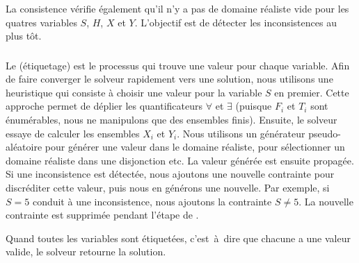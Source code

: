 La consistence vérifie également qu'il n'y a pas de domaine réaliste vide pour
les quatres variables $S$, $H$, $X$ et $Y$. L'objectif est de détecter les
inconsistences au plus tôt.

\subsubsection{}

Le  (étiquetage) est le processus qui trouve une valeur
pour chaque variable. Afin de faire converger le solveur rapidement vers une
solution, nous utilisons une heuristique qui consiste à choisir une valeur pour
la variable $S$ en premier. Cette approche permet de déplier les quantificateurs
$\forall$ et $\exists$ (puisque $F_i$ et $T_i$ sont énumérables, nous ne
manipulons que des ensembles finis). Ensuite, le solveur essaye de calculer les
ensembles $X_i$ et $Y_i$. Nous utilisons un générateur pseudo-aléatoire pour
générer une valeur dans le domaine réaliste, pour sélectionner un domaine
réaliste dans une disjonction etc. La valeur générée est ensuite propagée. Si
une inconsistence est détectée, nous ajoutons une nouvelle contrainte pour
discréditer cette valeur, puis nous en générons une nouvelle. Par exemple, si $S
= 5$ conduit à une inconsistence, nous ajoutons la contrainte $S \neq 5$. La
nouvelle contrainte est supprimée pendant l'étape de .

Quand toutes les variables sont étiquetées, c'est~à~dire que chacune a une valeur
valide, le solveur retourne la solution.
